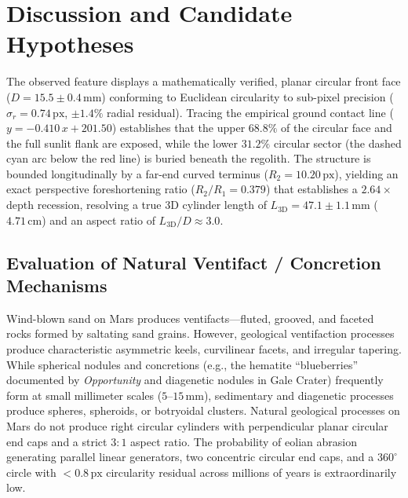 \documentclass[11pt,a4paper]{article}
\begin{document}
\section{Discussion and Candidate Hypotheses}

\begin{summarybox}
The observed feature displays a mathematically verified, planar circular front face ($D = 15.5 \pm 0.4\,\text{mm}$) conforming to Euclidean circularity to sub-pixel precision ($\sigma_r = 0.74\,\text{px}$, $\pm 1.4\%$ radial residual). Tracing the empirical ground contact line ($y = -0.410\,x + 201.50$) establishes that the upper $68.8\%$ of the circular face and the full sunlit flank are exposed, while the lower $31.2\%$ circular sector (the dashed cyan arc below the red line) is buried beneath the regolith. The structure is bounded longitudinally by a far-end curved terminus ($R_2 = 10.20\,\text{px}$), yielding an exact perspective foreshortening ratio ($R_2 / R_1 = 0.379$) that establishes a $2.64\times$ depth recession, resolving a true 3D cylinder length of $L_{\text{3D}} = 47.1 \pm 1.1\,\text{mm}$ ($4.71\,\text{cm}$) and an aspect ratio of $L_{\text{3D}} / D \approx 3.0$.
\end{summarybox}

\subsection{Evaluation of Natural Ventifact / Concretion Mechanisms}
Wind-blown sand on Mars produces ventifacts---fluted, grooved, and faceted rocks formed by saltating sand grains. However, geological ventifaction processes produce characteristic asymmetric keels, curvilinear facets, and irregular tapering. While spherical nodules and concretions (e.g., the hematite ``blueberries'' documented by \textit{Opportunity} and diagenetic nodules in Gale Crater) frequently form at small millimeter scales ($5\text{--}15\,\text{mm}$), sedimentary and diagenetic processes produce spheres, spheroids, or botryoidal clusters. Natural geological processes on Mars do not produce right circular cylinders with perpendicular planar circular end caps and a strict $3 : 1$ aspect ratio. The probability of eolian abrasion generating parallel linear generators, two concentric circular end caps, and a $360^\circ$ circle with $< 0.8\,\text{px}$ circularity residual across millions of years is extraordinarily low.
\end{document}
